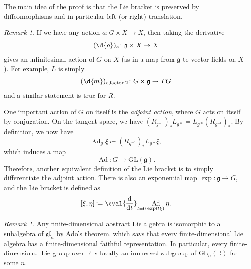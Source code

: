 \documentclass{amsart}
\theoremstyle{definition}
\theoremstyle{remark}
\newtheorem{rmk}[thm]{Remark}
\theoremstyle{plain}
\theoremstyle{definition}
\theoremstyle{remark}
\newcommand{\R}{\mathbb{R}}
\newcommand{\g}{\mathfrak{g}}
\newcommand{\mf}[1]{\mathfrak{#1}}
\newcommand{\mr}[1]{\mathrm{#1}}
\newcommand{\1}{\mathbf{1}}
\newcommand{\2}{\mathbf{2}}
\newcommand{\3}{\mathbf{3}}
\newcommand{\GL}{\mr{GL}}
\newcommand{\gl}{\mf{gl}}
\DeclareMathOperator{\Ad}{Ad}
\begin{document}
The main idea of the proof is that the Lie bracket is preserved by diffeomorphisms and in particular left (or right) translation. 

\begin{rmk}
    If we have any action \(a \colon G \times X \to X\), then taking the derivative
    \[ {(\d{a})_e} \colon \g \times X \to X \]
    gives an infinitesimal action of \(G\) on \(X\) (as in a map from \(\g\) to vector fields on \(X\)). For example, \(L\) is simply 
    \[ {(\d{m})_{e, \text{factor 2}}} \colon G \times \g \to TG \]
    and a similar statement is true for \(R\).
\end{rmk}

One important action of \(G\) on itself is the \textit{adjoint action}, where \(G\) acts on itself by conjugation. On the tangent space, we have \({(R_{g^{-1}})_*} L_{g*} = L_{g*} {(R_{g^{-1}})_*}\). By definition, we now have
\[ \Ad_g \xi \coloneqq {(R_{g^{-1}})_*} L_{g*} \xi, \]
which induces a map
\[ \Ad \colon G \to \GL(\g). \]
Therefore, another equivalent definition of the Lie bracket is to simply differentiate the adjoint action. There is also an exponential map \(\exp \colon \g \to G\), and the Lie bracket is defined as
\[ [\xi, \eta] \coloneqq \eval{\odv{}{t}}_{t=0} \Ad_{\exp(t\xi)} \eta. \]

\begin{rmk}
    Any finite-dimensional abstract Lie algebra is isomorphic to a subalgebra of \(\gl_n\) by Ado's theorem, which says that every finite-dimensional Lie algebra has a finite-dimensional faithful representation. In particular, every finite-dimensional Lie group over \(\R\) is locally an immersed subgroup of \(\GL_n(\R)\) for some \(n\).
\end{rmk}
\end{document}
